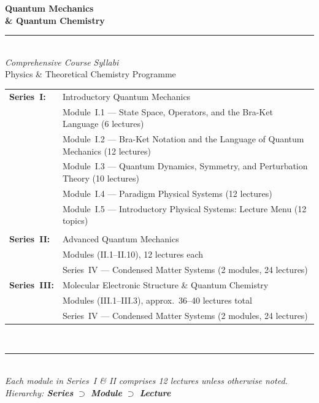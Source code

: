 \documentclass[11pt,a4paper]{article}
\begin{document}

\begin{titlepage}
\pagecolor{darkblue}
\color{white}
\vspace*{3cm}
\begin{center}
  {\fontsize{28}{34}\selectfont\bfseries Quantum Mechanics}\\[0.4cm]
  {\fontsize{18}{24}\selectfont\bfseries \& Quantum Chemistry}\\[0.6cm]
  {\color{accentgold}\rule{10cm}{2pt}}\\[0.6cm]
  {\large\itshape Comprehensive Course Syllabi}\\[0.3cm]
  {\normalsize Physics \& Theoretical Chemistry Programme}\\[2.5cm]
  \begin{tabular}{@{}lp{10.5cm}@{}}
    \textbf{Series~I:}   & Introductory Quantum Mechanics\\
                         & \quad Module~I.1 --- State Space, Operators, and the Bra-Ket Language (6 lectures)\\
                         & \quad Module~I.2 --- Bra-Ket Notation and the Language of Quantum Mechanics (12 lectures)\\
                         & \quad Module~I.3 --- Quantum Dynamics, Symmetry, and Perturbation Theory (10 lectures)\\
                         & \quad Module~I.4 --- Paradigm Physical Systems (12 lectures)\\
                         & \quad Module~I.5 --- Introductory Physical Systems: Lecture Menu (12 topics)\\
                         \\[6pt]
    \textbf{Series~II:}  & Advanced Quantum Mechanics\\
                         & \quad 10 Modules (II.1--II.10), 12 lectures each\\[6pt]
                         & \quad Series~IV --- Condensed Matter Systems (2 modules, 24 lectures)\\
    \textbf{Series~III:} & Molecular Electronic Structure \& Quantum Chemistry\\
                         & \quad 3 Modules (III.1--III.3), approx.\ 36--40 lectures total\\[6pt]
                         & \quad Series~IV --- Condensed Matter Systems (2 modules, 24 lectures)\\
  \end{tabular}\\[2.5cm]
  {\color{accentgold}\rule{10cm}{1pt}}\\[0.4cm]
  {\small\itshape Each module in Series~I \& II comprises 12 lectures unless otherwise noted.\\
  Hierarchy: \textbf{Series} $\supset$ \textbf{Module} $\supset$ \textbf{Lecture}}
\end{center}
\vfill
\end{titlepage}
\nopagecolor
\end{document}
